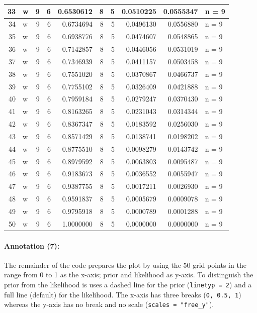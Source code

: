 \documentclass[
  letterpaper,
  DIV=11,
  numbers=noendperiod]{scrreprt}
\let\oldparagraph\paragraph
\renewcommand{\paragraph}[1]{\oldparagraph{#1}\mbox{}}
\begin{document}
\begin{table}
\begin{tabular}[t]{r|l|r|r|r|r|r|r|r|l}
\hline
33 & w & 9 & 6 & 0.6530612 & 8 & 5 & 0.0510225 & 0.0555347 & n = 9\\
\hline
34 & w & 9 & 6 & 0.6734694 & 8 & 5 & 0.0496130 & 0.0556880 & n = 9\\
\hline
35 & w & 9 & 6 & 0.6938776 & 8 & 5 & 0.0474607 & 0.0548865 & n = 9\\
\hline
36 & w & 9 & 6 & 0.7142857 & 8 & 5 & 0.0446056 & 0.0531019 & n = 9\\
\hline
37 & w & 9 & 6 & 0.7346939 & 8 & 5 & 0.0411157 & 0.0503458 & n = 9\\
\hline
38 & w & 9 & 6 & 0.7551020 & 8 & 5 & 0.0370867 & 0.0466737 & n = 9\\
\hline
39 & w & 9 & 6 & 0.7755102 & 8 & 5 & 0.0326409 & 0.0421888 & n = 9\\
\hline
40 & w & 9 & 6 & 0.7959184 & 8 & 5 & 0.0279247 & 0.0370430 & n = 9\\
\hline
41 & w & 9 & 6 & 0.8163265 & 8 & 5 & 0.0231043 & 0.0314344 & n = 9\\
\hline
42 & w & 9 & 6 & 0.8367347 & 8 & 5 & 0.0183592 & 0.0256030 & n = 9\\
\hline
43 & w & 9 & 6 & 0.8571429 & 8 & 5 & 0.0138741 & 0.0198202 & n = 9\\
\hline
44 & w & 9 & 6 & 0.8775510 & 8 & 5 & 0.0098279 & 0.0143742 & n = 9\\
\hline
45 & w & 9 & 6 & 0.8979592 & 8 & 5 & 0.0063803 & 0.0095487 & n = 9\\
\hline
46 & w & 9 & 6 & 0.9183673 & 8 & 5 & 0.0036552 & 0.0055947 & n = 9\\
\hline
47 & w & 9 & 6 & 0.9387755 & 8 & 5 & 0.0017211 & 0.0026930 & n = 9\\
\hline
48 & w & 9 & 6 & 0.9591837 & 8 & 5 & 0.0005679 & 0.0009078 & n = 9\\
\hline
49 & w & 9 & 6 & 0.9795918 & 8 & 5 & 0.0000789 & 0.0001288 & n = 9\\
\hline
50 & w & 9 & 6 & 1.0000000 & 8 & 5 & 0.0000000 & 0.0000000 & n = 9\\
\hline
\end{tabular}
\end{table}

\hypertarget{sec-annotation-7-ggplot}{%
\paragraph{Annotation (7):}\label{sec-annotation-7-ggplot}}

The remainder of the code prepares the plot by using the 50 grid points
in the range from 0 to 1 as the x-axis; prior and likelihood as y-axis.
To distinguish the prior from the likelihood is uses a dashed line for
the prior (\texttt{linetyp\ =\ 2}) and a full line (default) for the
likelihood. The x-axis has three breaks (\texttt{0,\ 0.5,\ 1}) whereas
the y-axis has no break and no scale (\texttt{scales\ =\ "free\_y"}).
\end{document}
